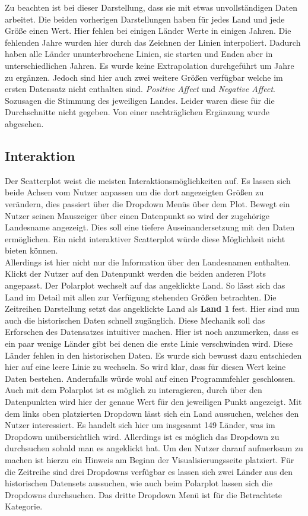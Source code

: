 Zu beachten ist bei dieser Darstellung, dass sie mit etwas unvollständigen Daten arbeitet. Die beiden vorherigen Darstellungen haben für jedes Land und jede Größe einen Wert. Hier fehlen bei einigen Länder Werte in einigen Jahren. Die fehlenden Jahre wurden hier durch das Zeichnen der Linien interpoliert. Dadurch haben alle Länder ununterbrochene Linien, sie starten und Enden aber in unterschiedlichen Jahren. Es wurde keine Extrapolation durchgeführt um Jahre zu ergänzen. Jedoch sind hier auch zwei weitere Größen verfügbar welche im ersten Datensatz nicht enthalten sind. \textit{Positive Affect} und \textit{Negative Affect}. Sozusagen die Stimmung des jeweiligen Landes. Leider waren diese für die Durchschnitte nicht gegeben. Von einer nachträglichen Ergänzung wurde abgesehen. 

\subsection{Interaktion}

Der Scatterplot weist die meisten Interaktionsmöglichkeiten auf. Es lassen sich beide Achsen vom Nutzer anpassen um die dort angezeigten Größen zu verändern, dies passiert über die Dropdown Menüs über dem Plot. Bewegt ein Nutzer seinen Mauszeiger über einen Datenpunkt so wird der zugehörige Landesname angezeigt. Dies soll eine tiefere Auseinandersetzung mit den Daten ermöglichen. Ein nicht interaktiver Scatterplot würde diese Möglichkeit nicht bieten können. \\

Allerdings ist hier nicht nur die Information über den Landesnamen enthalten. Klickt der Nutzer auf den Datenpunkt werden die beiden anderen Plots angepasst. Der Polarplot wechselt auf das angeklickte Land. So lässt sich das Land im Detail mit allen zur Verfügung stehenden Größen betrachten. Die Zeitreihen Darstellung setzt das angeklickte Land als \textbf{Land 1} fest. Hier sind nun auch die historischen Daten schnell zugänglich. Diese Mechanik soll das Erforschen des Datensatzes intuitiver machen. Hier ist noch anzumerken, dass es ein paar wenige Länder gibt bei denen die erste Linie verschwinden wird. Diese Länder fehlen in den historischen Daten. Es wurde sich bewusst dazu entschieden hier auf eine leere Linie zu wechseln. So wird klar, dass für diesen Wert keine Daten bestehen. Andernfalls würde wohl auf einen Programmfehler geschlossen.\\

Auch mit dem Polarplot ist es möglich zu interagieren, durch  über den Datenpunkten wird hier der genaue Wert für den jeweiligen Punkt angezeigt. 
Mit dem links oben platzierten Dropdown lässt sich ein Land aussuchen, welches den Nutzer interessiert. Es handelt sich hier um insgesamt 149 Länder, was im Dropdown unübersichtlich wird. Allerdings ist es möglich das Dropdown zu durchsuchen sobald man es angeklickt hat. Um den Nutzer darauf aufmerksam zu machen ist hierzu ein Hinweis  am Beginn der Visualisierungsseite platziert. Für die Zeitreihe sind drei Dropdowns verfügbar es lassen sich zwei Länder aus den historischen Datensets aussuchen, wie auch beim Polarplot lassen sich die Dropdowns durchsuchen. Das dritte Dropdown Menü ist für die Betrachtete Kategorie.
